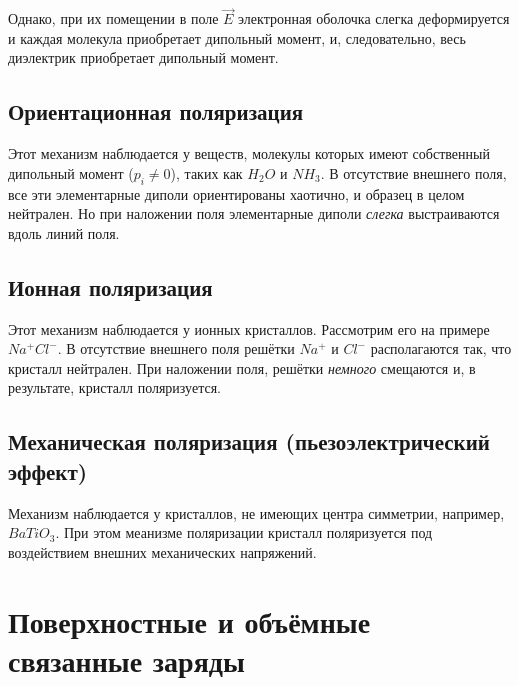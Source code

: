     Однако, при их помещении в поле \( \vec{E} \) электронная оболочка слегка
    деформируется и каждая молекула приобретает дипольный момент, и,
    следовательно, весь диэлектрик приобретает дипольный момент.
    
\subsection{Ориентационная поляризация}

    Этот механизм наблюдается у веществ, молекулы которых имеют собственный
    дипольный момент (\( p_i \ne 0 \)), таких как \( H_2O \text{ и } NH_3\).
    В отсутствие внешнего поля, все эти элементарные диполи ориентированы
    хаотично, и образец в целом нейтрален. Но при наложении поля элементарные
    диполи \textit{слегка} выстраиваются вдоль линий поля.
    
\subsection{Ионная поляризация}

    Этот механизм наблюдается у ионных кристаллов. Рассмотрим его на примере
    \( Na^{+}Cl^{-} \). В отсутствие внешнего поля решётки \( Na^{+} \) и
    \( Cl^{-} \) располагаются так, что кристалл нейтрален. При наложении поля,
    решётки \textit{немного} смещаются и, в результате, кристалл поляризуется.
    
\subsection{Механическая поляризация (пьезоэлектрический эффект)}

    Механизм наблюдается у кристаллов, не имеющих центра симметрии, например,
    \( BaTiO_3 \). При этом меанизме поляризации кристалл поляризуется под
    воздействием внешних механических напряжений.
      
\section{Поверхностные и объёмные связанные заряды}


